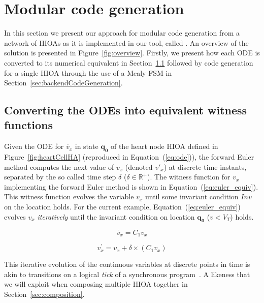 \section{Modular code generation}
\label{sec:codeGen}

In this section we present our approach for modular code generation from
a network of \acp{HIOA} as it is implemented in our tool, called
\ourTool.  An overview of the solution is presented in 
Figure~\ref{fig:overview}. Firstly, we present how each \ac{ODE} is converted 
to its numerical equivalent in Section~\ref{sec:converting-odes-into} followed 
by code generation for a single \ac{HIOA} through the use of a Mealy \ac{FSM} 
in Section~\ref{sec:backendCodeGeneration}.

\subsection{Converting the \acp{ODE} into equivalent witness functions}
\label{sec:converting-odes-into}

Given the \ac{ODE} for $\dot{v_x}$ in state $\mathbf{q_0}$ of the heart
node \ac{HIOA} defined in Figure~\ref{fig:heartCellHA} (reproduced in
Equation~(\ref{eq:ode})), the forward Euler method computes the next
value of $v_{x}$ (denoted $v'_{x}$) at discrete time instants, separated
by the so called time step $\delta$
($\delta \in \mathbb{R}^{+}$). The witness function for $v_{x}$
implementing the forward Euler method is shown in
Equation~(\ref{eq:euler_equiv}). This witness function evolves the
variable $v_{x}$ until some invariant condition $Inv$ on the location
holds. For the current example, Equation~(\ref{eq:euler_equiv}) evolves
$v_{x}$ \emph{iteratively} until the invariant condition on location
$\mathbf{q_{0}}$ ($v < V_{T}$) holds.


\begin{equation}
  \dot{v_x} = C_{1} v_x
  \label{eq:ode}
\end{equation}

\begin{equation}
  v^\prime_x = v_x + \delta \times (C_{1} v_x)
  \label{eq:euler_equiv}
\end{equation}


This iterative evolution of the continuous variables at discrete points
in time is akin to transitions on a logical \emph{tick} of a
synchronous program~\cite{benveniste03}. A likeness that we will exploit when 
composing multiple \ac{HIOA} together in Section~\ref{sec:composition}.


